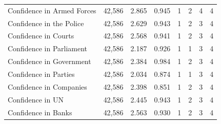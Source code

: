 \documentclass[11pt, ngerman,english,a4]{article}
\begin{document}
\begin{table}[!htbp]
\begin{tabular}{@{\extracolsep{5pt}}lccccccc}
		Confidence in Armed Forces     & 42,586                & 2.865                    & 0.945                        & 1                       & 2                        & 4                        & 4                       \\ 
		Confidence in the Police       & 42,586                & 2.629                    & 0.943                        & 1                       & 2                        & 3                        & 4                       \\ 
		Confidence in Courts           & 42,586                & 2.568                    & 0.941                        & 1                       & 2                        & 3                        & 4                       \\ 
		Confidence in Parliament       & 42,586                & 2.187                    & 0.926                        & 1                       & 1                        & 3                        & 4                       \\ 
		Confidence in Government       & 42,586                & 2.384                    & 0.984                        & 1                       & 2                        & 3                        & 4                       \\ 
		Confidence in Parties          & 42,586                & 2.034                    & 0.874                        & 1                       & 1                        & 3                        & 4                       \\ 
		Confidence in Companies        & 42,586                & 2.398                    & 0.851                        & 1                       & 2                        & 3                        & 4                       \\ 
		Confidence in UN               & 42,586                & 2.445                    & 0.943                        & 1                       & 2                        & 3                        & 4                       \\ 
		Confidence in Banks            & 42,586                & 2.563                    & 0.930                        & 1                       & 2                        & 3                        & 4                       \\ 

\end{tabular}
\end{table}
\end{document}
